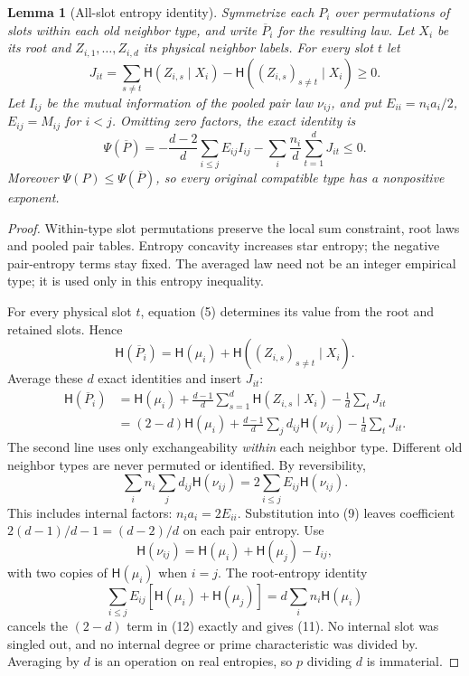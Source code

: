 \documentclass[11pt]{article}
\newtheorem{lemma}{Lemma}
\newcommand{\HH}{\mathsf H}
\begin{document}
\begin{lemma}[All-slot entropy identity]
Symmetrize each $P_i$ over permutations of slots within each old neighbor
type, and write $\overline P_i$ for the resulting law. Let $X_i$ be its
root and $Z_{i,1},\ldots,Z_{i,d}$ its physical neighbor labels. For every
slot $t$ let
\[
 J_{it}=\sum_{s\ne t}\HH(Z_{i,s}\mid X_i)
           -\HH((Z_{i,s})_{s\ne t}\mid X_i)\geq0.
\]
Let $I_{ij}$ be the mutual information of the pooled pair law $\nu_{ij}$,
and put $E_{ii}=n_i a_i/2$, $E_{ij}=M_{ij}$ for $i<j$. Omitting zero
factors, the exact identity is
\[
 \Psi(\overline P)=
 -\frac{d-2}{d}\sum_{i\leq j}E_{ij}I_{ij}
 -\sum_i\frac{n_i}{d}\sum_{t=1}^dJ_{it}\leq0.
 \tag{11}
\]
Moreover $\Psi(P)\leq\Psi(\overline P)$, so every original compatible
type has a nonpositive exponent.
\end{lemma}
\begin{proof}
Within-type slot permutations preserve the local sum constraint, root
laws and pooled pair tables. Entropy concavity increases star entropy;
the negative pair-entropy terms stay fixed. The averaged law need not be
an integer empirical type; it is used only in this entropy inequality.

For every physical slot $t$, equation (5) determines its value from the
root and retained slots. Hence
\[
 \HH(\overline P_i)=\HH(\mu_i)+
        \HH((Z_{i,s})_{s\ne t}\mid X_i).
\]
Average these $d$ exact identities and insert $J_{it}$:
\begin{align}
 \HH(\overline P_i)
 &=\HH(\mu_i)+\frac{d-1}{d}
           \sum_{s=1}^d\HH(Z_{i,s}\mid X_i)
          -\frac1d\sum_tJ_{it} \nonumber\\
 &=(2-d)\HH(\mu_i)+\frac{d-1}{d}
           \sum_jd_{ij}\HH(\nu_{ij})
          -\frac1d\sum_tJ_{it}.                  \tag{12}
\end{align}
The second line uses only exchangeability \emph{within} each neighbor
type. Different old neighbor types are never permuted or identified.
By reversibility,
\[
 \sum_i n_i\sum_jd_{ij}\HH(\nu_{ij})
      =2\sum_{i\leq j}E_{ij}\HH(\nu_{ij}).
 \tag{13}
\]
This includes internal factors: $n_i a_i=2E_{ii}$. Substitution into
(9) leaves coefficient $2(d-1)/d-1=(d-2)/d$ on each pair entropy.
Use
\[
 \HH(\nu_{ij})=\HH(\mu_i)+\HH(\mu_j)-I_{ij},
\]
with two copies of $\HH(\mu_i)$ when $i=j$. The root-entropy identity
\[
 \sum_{i\leq j}E_{ij}[\HH(\mu_i)+\HH(\mu_j)]
      =d\sum_i n_i\HH(\mu_i)
\]
cancels the $(2-d)$ term in (12) exactly and gives (11).
No internal slot was singled out, and no internal degree or prime
characteristic was divided by. Averaging by $d$ is an operation on real
entropies, so $p$ dividing $d$ is immaterial.
\end{proof}
\end{document}
